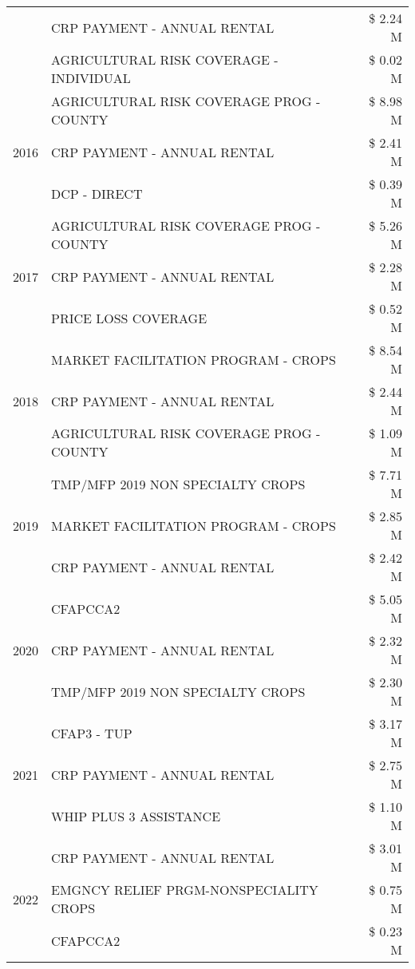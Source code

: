\begin{tabular}{llr}
 & CRP PAYMENT - ANNUAL RENTAL & \$ 2.24 M \\
 & AGRICULTURAL RISK COVERAGE - INDIVIDUAL & \$ 0.02 M \\
\cline{1-3}
\multirow[t]{3}{*}{2016} & AGRICULTURAL RISK COVERAGE PROG - COUNTY & \$ 8.98 M \\
 & CRP PAYMENT - ANNUAL RENTAL & \$ 2.41 M \\
 & DCP - DIRECT & \$ 0.39 M \\
\cline{1-3}
\multirow[t]{3}{*}{2017} & AGRICULTURAL RISK COVERAGE PROG - COUNTY & \$ 5.26 M \\
 & CRP PAYMENT - ANNUAL RENTAL & \$ 2.28 M \\
 & PRICE LOSS COVERAGE & \$ 0.52 M \\
\cline{1-3}
\multirow[t]{3}{*}{2018} & MARKET FACILITATION PROGRAM - CROPS & \$ 8.54 M \\
 & CRP PAYMENT - ANNUAL RENTAL & \$ 2.44 M \\
 & AGRICULTURAL RISK COVERAGE PROG - COUNTY & \$ 1.09 M \\
\cline{1-3}
\multirow[t]{3}{*}{2019} & TMP/MFP 2019 NON SPECIALTY CROPS & \$ 7.71 M \\
 & MARKET FACILITATION PROGRAM - CROPS & \$ 2.85 M \\
 & CRP PAYMENT - ANNUAL RENTAL & \$ 2.42 M \\
\cline{1-3}
\multirow[t]{3}{*}{2020} & CFAPCCA2 & \$ 5.05 M \\
 & CRP PAYMENT - ANNUAL RENTAL & \$ 2.32 M \\
 & TMP/MFP 2019 NON SPECIALTY CROPS & \$ 2.30 M \\
\cline{1-3}
\multirow[t]{3}{*}{2021} & CFAP3 - TUP & \$ 3.17 M \\
 & CRP PAYMENT - ANNUAL RENTAL & \$ 2.75 M \\
 & WHIP PLUS 3 ASSISTANCE & \$ 1.10 M \\
\cline{1-3}
\multirow[t]{3}{*}{2022} & CRP PAYMENT - ANNUAL RENTAL & \$ 3.01 M \\
 & EMGNCY RELIEF PRGM-NONSPECIALITY CROPS & \$ 0.75 M \\
 & CFAPCCA2 & \$ 0.23 M \\
\cline{1-3}
\bottomrule
\end{tabular}

